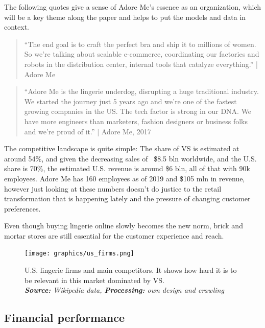 \documentclass[12pt]{article}
\begin{document}
The following quotes give a sense of Adore Me's essence as an organization, which will be a key theme along the paper and helps to put the models and data in context.

\begin{tcolorbox}
	\begin{quotation}
		“The end goal is to craft the perfect bra and ship it to millions of women. So we’re talking about scalable e-commerce, coordinating our factories and robots in the distribution center, internal tools that catalyze everything.” | Adore Me \cite{adoreme}
	\end{quotation}
\end{tcolorbox}


\begin{tcolorbox}
	\begin{quotation}
		“Adore Me is the lingerie underdog, disrupting a huge traditional industry. We started the journey just 5 years ago and we’re one of the fastest growing companies in the US. The tech factor is strong in our DNA. We have more engineers than marketers, fashion designers or business folks and we’re proud of it.” | Adore Me, 2017 \cite{adoreme}
	\end{quotation}
\end{tcolorbox}



The competitive landscape is quite simple: The share of VS is estimated at around 54\%, and given the decreasing sales of ~\$8.5 bln worldwide, and the U.S. share is 70\%, the estimated U.S. revenue is around \$6 bln, all of that with 90k employees. Adore Me has 160 employees as of 2019 and \$105 mln in revenue, however just looking at these numbers doesn't do justice to the retail transformation that is happening lately and the pressure of changing customer preferences.

Even though buying lingerie online slowly becomes the new norm, brick and mortar stores are still essential for the customer experience and reach.

\begin{figure}[!ht]
	\centering
	\texttt{[image: graphics/us\_firms.png]}%
	\caption{U.S. lingerie firms and main competitors. It shows how hard it is to be relevant in this market dominated by VS. \\ \textit{\textbf{Source:} Wikipedia data, \textbf{Processing:} own design and crawling}}
\end{figure}


\subsection{Financial performance}
\end{document}
